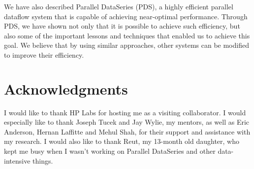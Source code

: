 \documentclass[ 11pt, letterpaper]{article}%
\begin{document}
We have also described Parallel DataSeries (PDS), a
highly efficient parallel dataflow system that is capable of achieving
near-optimal performance. Through PDS, we have shown not only that it is
possible to achieve such efficiency, but also some of the important lessons and
techniques that enabled us to achieve this goal. We believe that by using
similar approaches, other systems can be modified to improve their efficiency.

\section{Acknowledgments}

I would like to thank HP Labs for hosting me as a visiting collaborator. I
would especially like to thank Joseph Tucek and Jay Wylie, my mentors, as well as Eric Anderson, Hernan Laffitte and
Mehul Shah, for their support and assistance with my research. I would also
like to thank Reut, my 13-month old daughter, who kept me busy when I wasn't
working on Parallel DataSeries and other data-intensive things.

%
%


\end{document}
